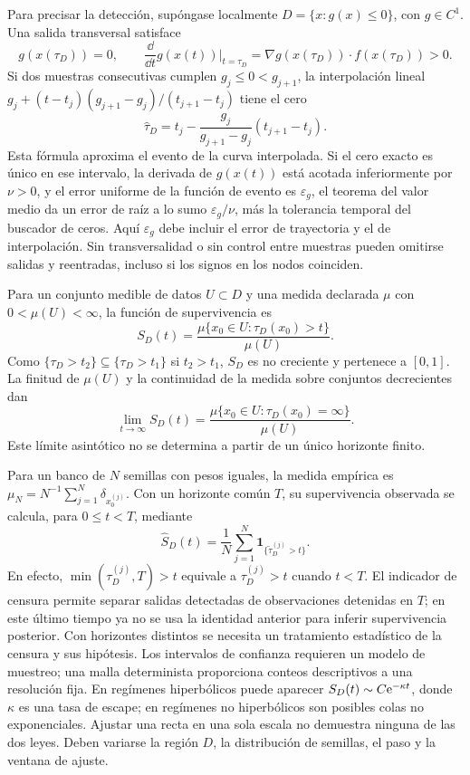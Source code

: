 Para precisar la detección, supóngase localmente
\(D=\{x:g(x)\leq0\}\), con \(g\in C^1\). Una salida transversal satisface
\[
 g(x(\tau_D))=0,\qquad
 \frac{\dd}{\dd t}g(x(t))\bigg|_{t=\tau_D}
 =\nabla g(x(\tau_D))\cdot f(x(\tau_D))>0.
\]
Si dos muestras consecutivas cumplen \(g_j\leq0<g_{j+1}\), la interpolación
lineal \(g_j+(t-t_j)(g_{j+1}-g_j)/(t_{j+1}-t_j)\) tiene el cero
\[
 \widehat\tau_D=t_j-
 \frac{g_j}{g_{j+1}-g_j}(t_{j+1}-t_j).
\]
Esta fórmula aproxima el evento de la curva interpolada. Si el cero exacto
es único en ese intervalo, la derivada de \(g(x(t))\) está acotada
inferiormente por \(\nu>0\), y el error uniforme de la función de evento es
\(\varepsilon_g\), el teorema del valor medio da un error de raíz a lo sumo
\(\varepsilon_g/\nu\), más la tolerancia temporal del buscador de ceros.
Aquí \(\varepsilon_g\) debe incluir el error de trayectoria y el de
interpolación. Sin transversalidad o sin control entre muestras pueden
omitirse salidas y reentradas, incluso si los signos en los nodos coinciden.

Para un conjunto medible de datos \(U\subset D\) y una medida declarada
\(\mu\) con \(0<\mu(U)<\infty\), la función de supervivencia es
\begin{equation}
 S_D(t)=
 \frac{\mu\{x_0\in U:\tau_D(x_0)>t\}}{\mu(U)}.
 \label{eq:reliability-survival}
\end{equation}
Como \(\{\tau_D>t_2\}\subseteq\{\tau_D>t_1\}\) si \(t_2>t_1\),
\(S_D\) es no creciente y pertenece a \([0,1]\). La finitud de \(\mu(U)\)
y la continuidad de la medida sobre conjuntos decrecientes dan
\[
 \lim_{t\to\infty}S_D(t)
 =\frac{\mu\{x_0\in U:\tau_D(x_0)=\infty\}}{\mu(U)}.
\]
Este límite asintótico no se determina a partir de un único horizonte finito.

Para un banco de \(N\) semillas con pesos iguales, la medida empírica es
\(\mu_N=N^{-1}\sum_{j=1}^N\delta_{x_0^{(j)}}\). Con un horizonte común
\(T\), su supervivencia observada se calcula, para \(0\leq t<T\), mediante
\begin{equation}
 \widehat S_D(t)=\frac1N\sum_{j=1}^N
                      \mathbf1_{\{\widetilde\tau_D^{(j)}>t\}}.
 \label{eq:reliability-empirical-survival}
\end{equation}
En efecto, \(\min(\tau_D^{(j)},T)>t\) equivale a
\(\tau_D^{(j)}>t\) cuando \(t<T\). El indicador de censura permite
separar salidas detectadas de observaciones detenidas en \(T\); en este
último tiempo ya no se usa la identidad anterior para inferir supervivencia
posterior. Con horizontes distintos se necesita un tratamiento estadístico de
la censura y sus hipótesis. Los intervalos de confianza requieren un modelo
de muestreo; una malla determinista proporciona conteos descriptivos a una
resolución fija.
En regímenes hiperbólicos puede aparecer
\(S_D(t)\sim C\mathrm e^{-\kappa t}\), donde \(\kappa\) es una tasa de escape; en
regímenes no hiperbólicos son posibles colas no exponenciales. Ajustar una
recta en una sola escala no demuestra ninguna de las dos leyes. Deben variarse
la región \(D\), la distribución de semillas, el paso y la ventana de ajuste.

